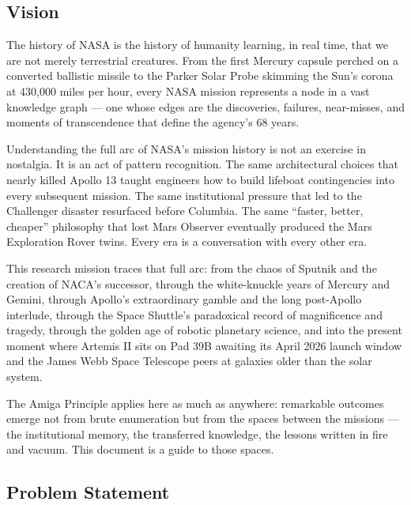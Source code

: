 \documentclass[11pt,letterpaper]{article}
\begin{document}
\subsection{Vision}

The history of NASA is the history of humanity learning, in real time, that we are not merely terrestrial creatures. From the first Mercury capsule perched on a converted ballistic missile to the Parker Solar Probe skimming the Sun's corona at 430,000 miles per hour, every NASA mission represents a node in a vast knowledge graph --- one whose edges are the discoveries, failures, near-misses, and moments of transcendence that define the agency's 68 years.

Understanding the full arc of NASA's mission history is not an exercise in nostalgia. It is an act of pattern recognition. The same architectural choices that nearly killed Apollo 13 taught engineers how to build lifeboat contingencies into every subsequent mission. The same institutional pressure that led to the Challenger disaster resurfaced before Columbia. The same ``faster, better, cheaper'' philosophy that lost Mars Observer eventually produced the Mars Exploration Rover twins. Every era is a conversation with every other era.

This research mission traces that full arc: from the chaos of Sputnik and the creation of NACA's successor, through the white-knuckle years of Mercury and Gemini, through Apollo's extraordinary gamble and the long post-Apollo interlude, through the Space Shuttle's paradoxical record of magnificence and tragedy, through the golden age of robotic planetary science, and into the present moment where Artemis II sits on Pad 39B awaiting its April 2026 launch window and the James Webb Space Telescope peers at galaxies older than the solar system.

The Amiga Principle applies here as much as anywhere: remarkable outcomes emerge not from brute enumeration but from the spaces between the missions --- the institutional memory, the transferred knowledge, the lessons written in fire and vacuum. This document is a guide to those spaces.

\subsection{Problem Statement}
\end{document}
